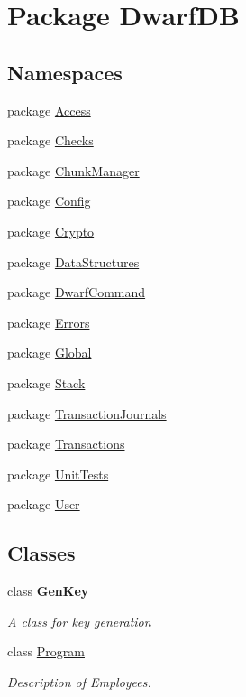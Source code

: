 \hypertarget{namespace_dwarf_d_b}{\section{Package Dwarf\+D\+B}
\label{namespace_dwarf_d_b}
}
\subsection*{Namespaces}
\begin{DoxyCompactItemize}
\item 
package \hyperlink{namespace_dwarf_d_b_1_1_access}{Access}
\item 
package \hyperlink{namespace_dwarf_d_b_1_1_checks}{Checks}
\item 
package \hyperlink{namespace_dwarf_d_b_1_1_chunk_manager}{Chunk\+Manager}
\item 
package \hyperlink{namespace_dwarf_d_b_1_1_config}{Config}
\item 
package \hyperlink{namespace_dwarf_d_b_1_1_crypto}{Crypto}
\item 
package \hyperlink{namespace_dwarf_d_b_1_1_data_structures}{Data\+Structures}
\item 
package \hyperlink{namespace_dwarf_d_b_1_1_dwarf_command}{Dwarf\+Command}
\item 
package \hyperlink{namespace_dwarf_d_b_1_1_errors}{Errors}
\item 
package \hyperlink{namespace_dwarf_d_b_1_1_global}{Global}
\item 
package \hyperlink{namespace_dwarf_d_b_1_1_stack}{Stack}
\item 
package \hyperlink{namespace_dwarf_d_b_1_1_transaction_journals}{Transaction\+Journals}
\item 
package \hyperlink{namespace_dwarf_d_b_1_1_transactions}{Transactions}
\item 
package \hyperlink{namespace_dwarf_d_b_1_1_unit_tests}{Unit\+Tests}
\item 
package \hyperlink{namespace_dwarf_d_b_1_1_user}{User}
\end{DoxyCompactItemize}
\subsection*{Classes}
\begin{DoxyCompactItemize}
\item 
class {\bfseries Gen\+Key}
\begin{DoxyCompactList}\small\item\em A class for key generation \end{DoxyCompactList}\item 
class \hyperlink{class_dwarf_d_b_1_1_program}{Program}
\begin{DoxyCompactList}\small\item\em Description of Employees. \end{DoxyCompactList}\end{DoxyCompactItemize}
